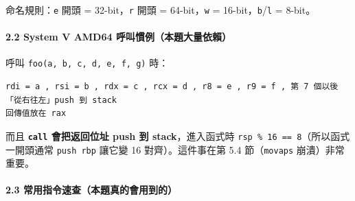 \documentclass[10pt,a4paper]{article}
\renewenvironment{quote}{%
  \begin{mdframed}[linewidth=0pt,innerleftmargin=0pt,innerrightmargin=0pt,
    innerbottommargin=0pt,innertopmargin=0pt,skipabove=0.55em,skipbelow=0.55em,
    leftmargin=0.9em,rightmargin=0.4em,startcode={\color{quotebar}\vrule width 2.6pt},%
    endcode={}]%
  \itshape\color{black}%
}{%
  \end{mdframed}%
}
\begin{document}
\begin{quote}
命名規則：\texttt{e} 開頭 = 32-bit，\texttt{r} 開頭 = 64-bit，\texttt{w}
= 16-bit，\texttt{b}/\texttt{l} = 8-bit。
\end{quote}

\paragraph{2.2 System V AMD64
呼叫慣例（本題大量依賴）}\label{system-v-amd64-ux547cux53ebux6163ux4f8bux672cux984cux5927ux91cfux4f9dux8cf4}

呼叫 \texttt{foo(a,\allowbreak{}\ \allowbreak{}b,\allowbreak{}\ \allowbreak{}c,\allowbreak{}\ \allowbreak{}d,\allowbreak{}\ \allowbreak{}e,\allowbreak{}\ \allowbreak{}f,\allowbreak{}\ \allowbreak{}g)} 時：

\begin{Verbatim}[breaklines=true,breakanywhere=true,breakautoindent=false,fontsize=\fontsize{7.0}{9.5}\selectfont]
rdi = a , rsi = b , rdx = c , rcx = d , r8 = e , r9 = f , 第 7 個以後「從右往左」push 到 stack
回傳值放在 rax
\end{Verbatim}

而且 \textbf{\texttt{call} 會把返回位址 push 到 stack}，進入函式時
\texttt{rsp\ \allowbreak{}\%\allowbreak{}\ \allowbreak{}16\ \allowbreak{}==\ \allowbreak{}8}（所以函式一開頭通常 \texttt{push\ \allowbreak{}rbp}
讓它變 16 對齊）。這件事在第 5.4 節（\texttt{movaps} 崩潰）非常重要。

\paragraph{2.3
常用指令速查（本題真的會用到的）}\label{ux5e38ux7528ux6307ux4ee4ux901fux67e5ux672cux984cux771fux7684ux6703ux7528ux5230ux7684}
\end{document}
